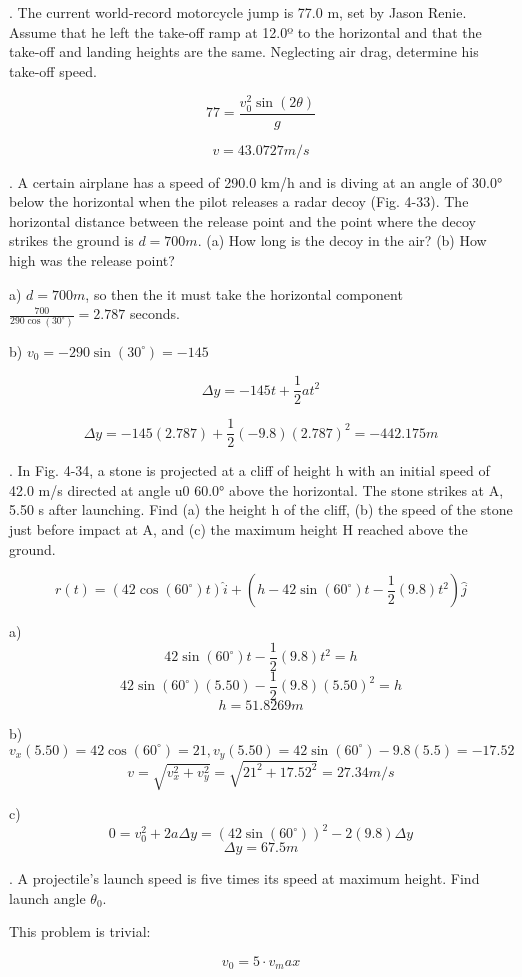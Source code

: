 \documentclass{scrreprt} %
\begin{document}
. The current world-record motorcycle jump is 77.0 m,
set  by  Jason  Renie. Assume  that he  left  the  take-off  ramp  at  
12.0º to the horizontal and that the take-off and landing 
heights are the same. Neglecting air drag, determine his take-off
speed.

$$77=\frac{v_0^2\sin(2\theta)}{g}$$

$$\boxed{v = 43.0727 m/s}$$

. A certain airplane has a
speed  of  290.0 km/h  and  is  diving
at  an  angle  of 30.0° below  the
horizontal  when  the pilot  releases
a radar decoy (Fig. 4-33). The horizontal distance between the 
release  point  and  the  point  where
the decoy strikes the ground is $d =
700 m$. (a) How long is the decoy in
the  air?  (b) How high was the release point?

a) $d = 700m$, so then the it must take the horizontal component
$\frac{700}{290\cos(30^\circ)}=\boxed{2.787}$ seconds.

b) $v_0 = -290\sin(30^\circ) = -145$

$$\Delta y = -145t + \frac{1}{2}at^2$$

$$\Delta y = -145(2.787) + \frac{1}{2}(-9.8)(2.787)^2 = \boxed{-442.175 m}$$

. In Fig. 4-34, a stone is projected at a cliff of height h with an initial speed of 42.0 m/s directed
at  angle  u0 60.0° above  the  horizontal. The  stone  strikes  at  A,
5.50 s  after  launching. Find  (a)  the  height  h of  the  cliff, (b)  the
speed of the stone just before impact at A, and (c) the maximum
height H reached above the ground.

$$r(t) = (42\cos(60^\circ)t)\hat{i} + (h - 42\sin(60^\circ)t - \frac{1}{2}(9.8)t^2)\hat{j}$$

a)  $$42\sin(60^\circ)t - \frac{1}{2}(9.8)t^2 = h$$
	$$42\sin(60^\circ)(5.50) - \frac{1}{2}(9.8)(5.50)^2 = h$$
	$$\boxed{h = 51.8269 m}$$

b) 	$$v_x(5.50) = 42\cos(60^\circ) = 21, v_y(5.50) = 42\sin(60^\circ) - 9.8(5.5) = -17.52$$
	$$v = \sqrt{v_x^2 + v_y^2} = \sqrt{21^2 + 17.52^2} = \boxed{27.34 m/s}$$

c) 	$$0 = v_0^2 + 2a\Delta y = (42\sin(60^\circ))^2 - 2(9.8)\Delta y$$
	$$\boxed{\Delta y = 67.5m}$$

. A projectile's launch speed is five times its speed at maximum height.
Find launch angle $\theta_0$.

This problem is trivial:

$$v_0 = 5\cdot v_max$$
\end{document}
